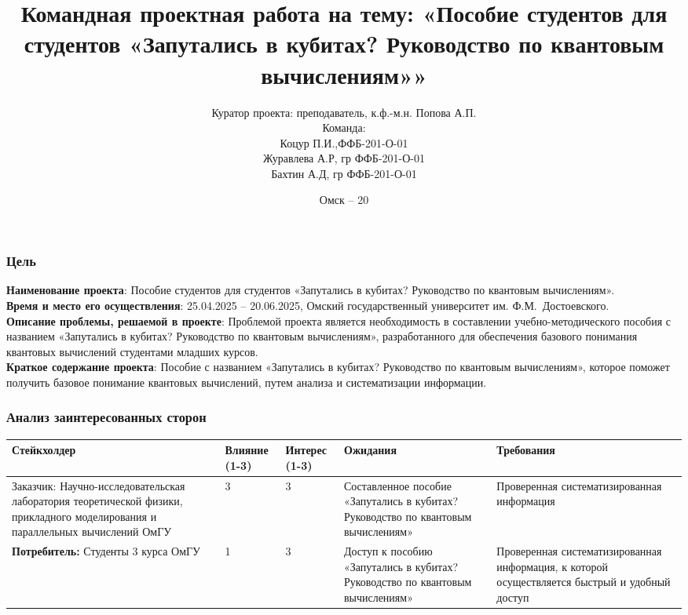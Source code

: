 \documentclass{beamer}
\title[Пособие для студентов]
{ Командная проектная работа
	на тему: «Пособие студентов для студентов «Запутались в кубитах?  Руководство по квантовым вычислениям»»}
\author[Журавлева А.Р, Коцур П.И, Бахтин А.Д.]
{Куратор проекта: преподаватель, к.ф.-м.н.
	Попова А.П.\\
	Команда:\\ Коцур П.И.,ФФБ-201-О-01\\
	Журавлева А.Р, гр ФФБ-201-О-01\\
	Бахтин А.Д, гр ФФБ-201-О-01}
\institute[ОмГУ]
{
	ОмГУ им. Ф.М.~Достоевского\\[5pt]
	
}
\date[Омск -- 20\Year]
{Омск -- 20\Year}
\begin{document}
	
	\frame{\titlepage}
	
	
	\begin{frame}\frametitle{Цель}
		\justifying \textbf {Наименование проекта}: Пособие студентов для студентов «Запутались в кубитах?  Руководство по квантовым вычислениям».\\
		
		\justifying \textbf{Время и место его осуществления}: 25.04.2025 – 20.06.2025, Омский государственный университет им. Ф.М. Достоевского.\\
		
		\justifying \textbf {Описание проблемы, решаемой в проекте}: Проблемой проекта является необходимость в составлении учебно-методического пособия с названием «Запутались в кубитах?  Руководство по квантовым вычислениям», разработанного для обеспечения базового понимания квантовых вычислений студентами младших курсов.\\
		
		\justifying  \textbf{Краткое содержание проекта}: Пособие с названием «Запутались в кубитах?  Руководство по квантовым вычислениям», которое поможет получить базовое понимание квантовых вычислений, путем анализа и систематизации информации. \\
	\end{frame}
 
 \begin{frame}\frametitle{Анализ заинтересованных сторон }
 		\setlength{\tabcolsep}{3pt}
 		\small
\begin{longtable}{|p{2.8cm}|p{1.5cm}|p{1.5cm}|p{2.6cm}|p{2.8cm}|}

	\hline
	\textbf{Стейкхолдер} & \textbf{Влияние (1-3)} & \textbf{Интерес (1-3)} & \textbf{Ожидания} & \textbf{Требования} \\ \hline
	Заказчик: 
	Научно-исследовательская лаборатория теоретической физики, прикладного моделирования и параллельных вычислений ОмГУ & 3 & 3 & 
	Составленное пособие «Запутались в кубитах?  Руководство по квантовым вычислениям»& 
	Проверенная систематизированная информация \\ \hline
	
	\textbf{Потребитель:} Студенты 3 курса ОмГУ & 1 & 3 & 
	Доступ к пособию «Запутались в кубитах?  Руководство по квантовым вычислениям»& 
	Проверенная систематизированная информация, к которой осуществляется быстрый и удобный доступ \\ \hline
\end{longtable}
 
\end{frame}
 
\end{document}
